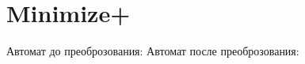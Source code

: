\section{Minimize+}
\begin{frame}{}
	Автомат до преоброзования:
	Автомат после преоброзования:
\end{frame}
